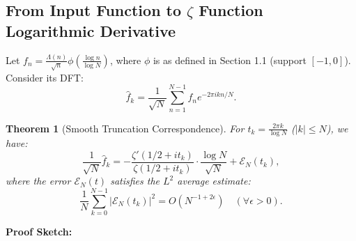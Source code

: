 \documentclass[12pt,a4paper]{amsart}
\theoremstyle{plain}
\newtheorem{theorem}{Theorem}[section]
\theoremstyle{definition}
\theoremstyle{remark}
\begin{document}
\subsection{From Input Function to $\zeta$ Function Logarithmic Derivative}

Let $f_n = \frac{\Lambda(n)}{\sqrt{n}} \phi\left(\frac{\log n}{\log N}\right)$, where $\phi$ is as defined in Section 1.1 (support $[-1,0]$). Consider its DFT:
\begin{equation}
\hat{f}_k = \frac{1}{\sqrt{N}}\sum_{n=1}^{N-1} f_n e^{-2\pi i k n/N}.
\end{equation}

\begin{theorem}[Smooth Truncation Correspondence]\label{thm:log_deriv}
For $t_k = \frac{2\pi k}{\log N}$ ($|k|\le N$), we have:
\begin{equation}
\frac{1}{\sqrt{N}}\hat{f}_k = -\frac{\zeta'(1/2+it_k)}{\zeta(1/2+it_k)}\cdot\frac{\log N}{\sqrt{N}} + \mathcal{E}_N(t_k),
\end{equation}
where the error $\mathcal{E}_N(t)$ satisfies the $L^2$ average estimate:
\begin{equation}
\frac{1}{N}\sum_{k=0}^{N-1} |\mathcal{E}_N(t_k)|^2 = O(N^{-1+2\epsilon}) \quad (\forall \epsilon>0).
\end{equation}
\end{theorem}

\textbf{Proof Sketch:}
\end{document}
